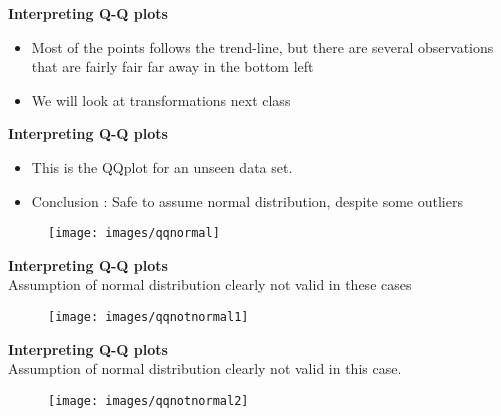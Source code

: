 \documentclass{beamer}
\begin{document}
\begin{frame}
\large
	\textbf{Interpreting Q-Q plots}\\ 
\begin{itemize}
	\item Most of the points follows the trend-line, but there are several observations that are fairly fair far away in the bottom left
	\item We will look at transformations next class
\end{itemize}
		\end{frame}
	\begin{frame}
		\textbf{Interpreting Q-Q plots}\\ 
\begin{itemize}
\item This is the QQplot for an unseen data set.
\item Conclusion : Safe to assume normal distribution, despite some outliers
\end{itemize}
		\begin{figure}
\centering
\texttt{[image: images/qqnormal]}

\end{figure}
	\end{frame}
		\begin{frame}
		\textbf{Interpreting Q-Q plots}\\ Assumption of normal distribution clearly not valid in these cases
\begin{figure}
\centering
\texttt{[image: images/qqnotnormal1]}

\end{figure}
			
		\end{frame}
			\begin{frame}
					\textbf{Interpreting Q-Q plots}\\ Assumption of normal distribution clearly not valid in this case.
			\begin{figure}
				\centering
				\texttt{[image: images/qqnotnormal2]}

			\end{figure}
			
		\end{frame}		
\end{document}
